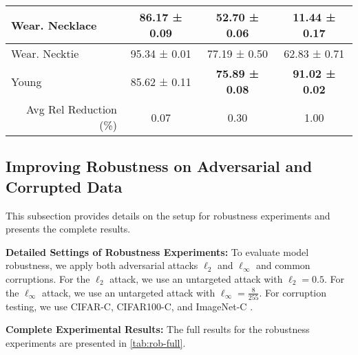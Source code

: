 \begin{table*}[h]
\begin{center}
\begin{small}
{\begin{tabular}{|l|c|c|c|}
Wear. Necklace  & 86.17 ± 0.09 & 52.70 ± 0.06 & 11.44 ± 0.17 \\ \hline
Wear. Necktie   & 95.34 ± 0.01 & 77.19 ± 0.50 & 62.83 ± 0.71 \\ \hline
Young           & 85.62 ± 0.11 & \textbf{75.89 ± 0.08} & \textbf{91.02 ± 0.02} \\ \hline
\multicolumn{1}{|r|}{Avg Rel Reduction (\%)} 
                & 0.07 & 0.30 & 1.00 \\ \hline
\end{tabular}
}
\end{small}
\end{center}
\vskip -0.1in
\end{table*}



\subsection{Improving Robustness on Adversarial and Corrupted Data}\label{app:exp-rob}  
This subsection provides details on the setup for robustness experiments and presents the complete results.  

\textbf{Detailed Settings of Robustness Experiments:} To evaluate model robustness, we apply both adversarial attacks $\ell_2$ and $\ell_\infty$ and common corruptions. For the $\ell_2$ attack, we use an untargeted attack with $\ell_2 = 0.5$. For the $\ell_\infty$ attack, we use an untargeted attack with $\ell_\infty = \frac{8}{255}$. For corruption testing, we use CIFAR-C, CIFAR100-C, and ImageNet-C \cite{hendrycks2019corruption}.  

\textbf{Complete Experimental Results:} The full results for the robustness experiments are presented in \cref{tab:rob-full}.

